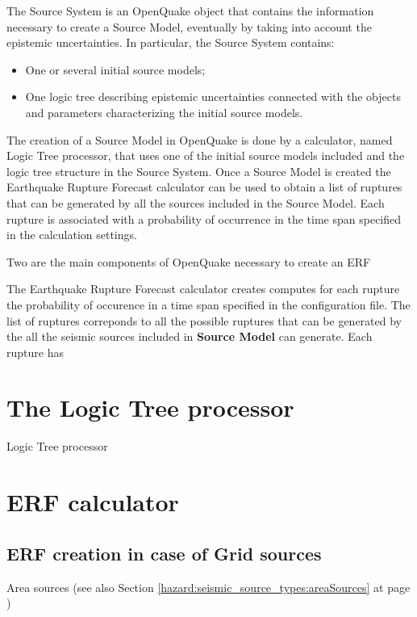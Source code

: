The Source System is an OpenQuake object that contains the information necessary to create a Source Model, eventually by taking into account the epistemic uncertainties. 
%
In particular, the Source System contains:
\begin{itemize}
\item One or several initial source models;
\item One logic tree describing epistemic uncertainties connected with the objects and parameters characterizing the initial source models.
\end{itemize}
%
The creation of a Source Model in OpenQuake is done by a calculator, named Logic Tree processor, that uses one of the initial source models included  and the logic tree structure in the Source System. 
% 
Once a Source Model is created the Earthquake Rupture Forecast calculator can be used to obtain a list of ruptures that can be generated by all the sources included in the Source Model. Each rupture is associated with a probability of occurrence in the time span specified in the calculation settings. 
 


Two are the main components of OpenQuake necessary to create an ERF

The Earthquake Rupture Forecast calculator creates  computes for each rupture the probability of occurence in a time span specified in the configuration file.
The list of ruptures correponds to all the possible ruptures that can be generated by the all the seismic sources included in \textbf{Source Model} can generate. Each rupture has 


%
\section{The Logic Tree processor}
Logic Tree processor

%
\section{ERF calculator}

%
\subsection{ERF creation in case of Grid sources}
Area sources (see also Section \ref{hazard:seismic_source_types:areaSources} 
at page \pageref{hazard:seismic_source_types:areaSources}) 

